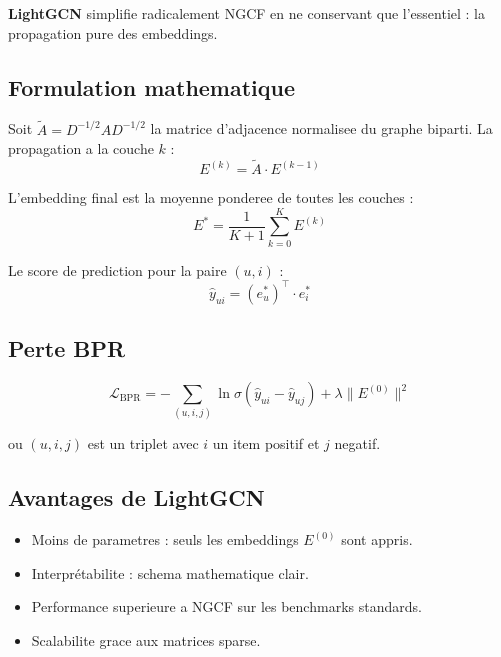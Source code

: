 \documentclass[12pt,a4paper]{report}
\begin{document}
\textbf{LightGCN} simplifie radicalement NGCF en ne conservant que
l'essentiel : la propagation pure des embeddings.

\subsection{Formulation mathematique}

Soit $\tilde{A} = D^{-1/2} A D^{-1/2}$ la matrice d'adjacence
normalisee du graphe biparti. La propagation a la couche $k$ :
\begin{equation}
  E^{(k)} = \tilde{A} \cdot E^{(k-1)}
\end{equation}

L'embedding final est la moyenne ponderee de toutes les couches :
\begin{equation}
  E^* = \frac{1}{K+1} \sum_{k=0}^{K} E^{(k)}
\end{equation}

Le score de prediction pour la paire $(u, i)$ :
\begin{equation}
  \hat{y}_{ui} = (e_u^*)^\top \cdot e_i^*
\end{equation}

\subsection{Perte BPR}

\begin{equation}
  \mathcal{L}_{\text{BPR}} = -\sum_{(u,i,j)}
  \ln \sigma(\hat{y}_{ui} - \hat{y}_{uj})
  + \lambda \|E^{(0)}\|^2
\end{equation}

ou $(u,i,j)$ est un triplet avec $i$ un item positif et $j$ negatif.

\subsection{Avantages de LightGCN}

\begin{itemize}
  \item Moins de parametres : seuls les embeddings $E^{(0)}$ sont
    appris.
  \item Interprétabilite : schema mathematique clair.
  \item Performance superieure a NGCF sur les benchmarks standards.
  \item Scalabilite grace aux matrices sparse.
\end{itemize}
\end{document}
